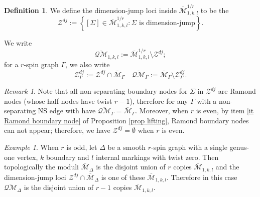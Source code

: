 \documentclass[11pt]{amsart}
\theoremstyle{definition}
\newtheorem{dfn}[dummy]{Definition}
\theoremstyle{remark}
\newtheorem{rmk}[dummy]{Remark}
\newtheorem{ex}[dummy]{Example}
\newcommand{\oQMb}{{\overline{\mathcal{QM}}}}
\newcommand{\<}{\left<}
\renewcommand{\>}{\right>}
\numberwithin{equation}{section}
\def\Mbar{{\overline{\mathcal M}}}
\begin{document}
\begin{dfn}
    We define the dimension-jump loci inside $\Mbar^{1/r}_{1,k,l}$ to %
be the 
    \begin{equation*}
         \mathcal Z^{dj}:=\left\{[\Sigma]\in \Mbar^{1/r}_{1,k,l} \colon \Sigma \text{ is dimension-jump}\right\}.
    \end{equation*}

    We %
write 
    \begin{equation*}
        \oQMb_{1,k,l}:=\Mbar^{1/r}_{1,k,l}\setminus \mathcal Z^{dj};
    \end{equation*}
    for %
a $r$-spin %
graph $\Gamma$, we %
also write 
    \begin{equation*}
        \mathcal Z^{dj}_{\Gamma}:=\mathcal Z^{dj}\cap \Mbar_{\Gamma}\quad\oQMb_\Gamma:=\Mbar_\Gamma\setminus \mathcal Z^{dj}_{\Gamma}.
    \end{equation*}
\end{dfn}

\begin{rmk}\label{rmk dim jump non separating}
    Note that all non-separating boundary nodes for $\Sigma$ in $\mathcal Z^{dj}$ are Ramond nodes (whose half-nodes have twist $r-1$), therefore for any $\Gamma$ with a non-separating NS edge with have $\oQMb_{\Gamma}=\Mbar_{\Gamma}$.     
   Moreover, when $r$ is even, %
by item \ref{it Ramond boundary node} of Proposition \ref{prop lifting}, Ramond %
boundary nodes can not appear; therefore, we have $\mathcal Z^{dj}=\emptyset$ when $r$ is even.
\end{rmk}



\begin{ex}
    When $r$ is odd, let $\Delta$ be a smooth $r$-spin graph with a single genus-one vertex, %
$k$ boundary and %
$l$ internal markings with twist zero. Then topologically the moduli $\Mbar_\Delta$ is the disjoint union of $r$ copies  $\Mbar_{1,k,l}$ and the dimension-jump loci $\mathcal Z^{dj}\cap\Mbar_\Delta$ is one of these $\Mbar_{1,k,l}$. Therefore in this case $\oQMb_\Delta$ is the disjoint union of $r-1$ copies  $\Mbar_{1,k,l}$.
\end{ex}
\end{document}
